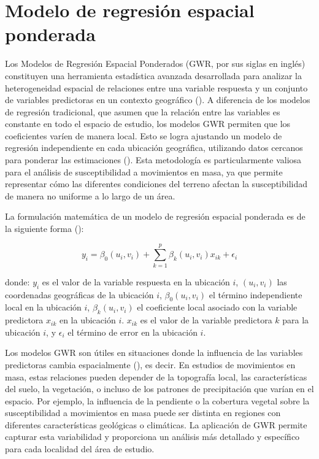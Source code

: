 \documentclass[
  manuscript=article,  
  layout=preprint,  
]{format}
\begin{document}
\section{Modelo de regresión espacial ponderada}

Los Modelos de Regresión Espacial Ponderados (GWR, por sus siglas en inglés) constituyen una herramienta estadística avanzada desarrollada para analizar la heterogeneidad espacial de relaciones entre una variable respuesta y un conjunto de variables predictoras en un contexto geográfico (\cite{brunsdon1996geographically, fotheringham2000quantitative, fotheringham2009geographically}). A diferencia de los modelos de regresión tradicional, que asumen que la relación entre las variables es constante en todo el espacio de estudio, los modelos GWR permiten que los coeficientes varíen de manera local. Esto se logra ajustando un modelo de regresión independiente en cada ubicación geográfica, utilizando datos cercanos para ponderar las estimaciones (\cite{brunsdon1996geographically}). Esta metodología es particularmente valiosa para el análisis de susceptibilidad a movimientos en masa, ya que permite representar cómo las diferentes condiciones del terreno afectan la susceptibilidad de manera no uniforme a lo largo de un área.

La formulación matemática de un modelo de regresión espacial ponderada es de la siguiente forma (\cite{brunsdon1996geographically}):

\[
y_i = \beta_0(u_i, v_i) + \sum_{k=1}^p \beta_k(u_i, v_i) x_{ik} + \epsilon_i
\]

donde: \( y_i \) es el valor de la variable respuesta en la ubicación \( i \), \( (u_i, v_i) \) las coordenadas geográficas de la ubicación \( i \), \( \beta_0(u_i, v_i) \) el término independiente local en la ubicación \( i \), \( \beta_k(u_i, v_i) \) el coeficiente local asociado con la variable predictora \( x_{ik} \) en la ubicación \( i \). \( x_{ik} \) es el valor de la variable predictora \( k \) para la ubicación \( i \), y \( \epsilon_i \) el término de error en la ubicación \( i \).

Los modelos GWR son útiles en situaciones donde la influencia de las variables predictoras cambia espacialmente (\cite{fotheringham2009geographically}), es decir. En estudios de movimientos en masa, estas relaciones pueden depender de la topografía local, las características del suelo, la vegetación, o incluso de los patrones de precipitación que varían en el espacio. Por ejemplo, la influencia de la pendiente o la cobertura vegetal sobre la susceptibilidad a movimientos en masa puede ser distinta en regiones con diferentes características geológicas o climáticas. La aplicación de GWR permite capturar esta variabilidad y proporciona un análisis más detallado y específico para cada localidad del área de estudio.
\end{document}
